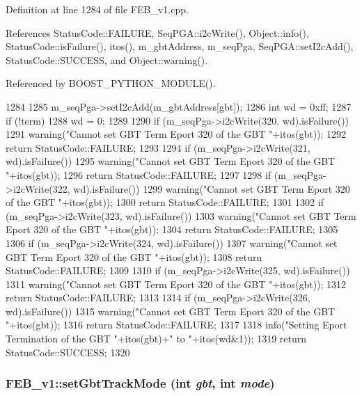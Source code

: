 Definition at line 1284 of file FEB\_\-v1.cpp.

References StatusCode::FAILURE, SeqPGA::i2cWrite(), Object::info(), StatusCode::isFailure(), itos(), m\_\-gbtAddress, m\_\-seqPga, SeqPGA::setI2cAdd(), StatusCode::SUCCESS, and Object::warning().

Referenced by BOOST\_\-PYTHON\_\-MODULE().


\begin{DoxyCode}
1284                                                     {
1285   m_seqPga->setI2cAdd(m_gbtAddress[gbt]);
1286   int wd = 0xff;
1287   if (!term){
1288     wd = 0;
1289   }
1290   if (m_seqPga->i2cWrite(320, wd).isFailure()){
1291     warning("Cannot set GBT Term Eport 320 of the GBT "+itos(gbt));
1292     return StatusCode::FAILURE;
1293   }
1294   if (m_seqPga->i2cWrite(321, wd).isFailure()){
1295     warning("Cannot set GBT Term Eport 320 of the GBT "+itos(gbt));
1296     return StatusCode::FAILURE;
1297   }
1298   if (m_seqPga->i2cWrite(322, wd).isFailure()){
1299     warning("Cannot set GBT Term Eport 320 of the GBT "+itos(gbt));
1300     return StatusCode::FAILURE;
1301   }
1302   if (m_seqPga->i2cWrite(323, wd).isFailure()){
1303     warning("Cannot set GBT Term Eport 320 of the GBT "+itos(gbt));
1304     return StatusCode::FAILURE;
1305   }
1306   if (m_seqPga->i2cWrite(324, wd).isFailure()){
1307     warning("Cannot set GBT Term Eport 320 of the GBT "+itos(gbt));
1308     return StatusCode::FAILURE;
1309   }
1310   if (m_seqPga->i2cWrite(325, wd).isFailure()){
1311     warning("Cannot set GBT Term Eport 320 of the GBT "+itos(gbt));
1312     return StatusCode::FAILURE;
1313   }
1314   if (m_seqPga->i2cWrite(326, wd).isFailure()){
1315     warning("Cannot set GBT Term Eport 320 of the GBT "+itos(gbt));
1316     return StatusCode::FAILURE;
1317   }
1318   info("Setting Eport Termination of the GBT "+itos(gbt)+" to "+itos(wd&1));
1319   return StatusCode::SUCCESS;
1320 }
\end{DoxyCode}
\hypertarget{classFEB__v1_ab65b869df2adc4d3880caad71a4e3074}{
\subsubsection[{setGbtTrackMode}]{ FEB\_\-v1::setGbtTrackMode (int {\em gbt}, \/  int {\em mode})}}
\label{classFEB__v1_ab65b869df2adc4d3880caad71a4e3074}


